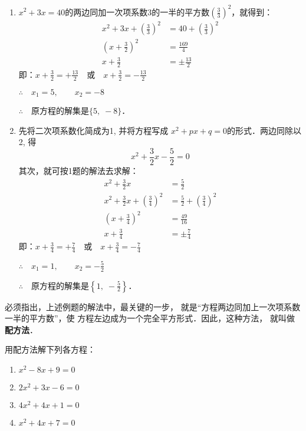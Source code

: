 \begin{solution}
\begin{enumerate}
    \item $x^2+3x=40$的两边同加一次项系数3的一半的平方数$\left(\frac{3}{3}\right)^2$，就得到：
\begin{align*}
    x^2+3x+ \left(\frac{3}{3}\right)^2&=40+\left(\frac{3}{3}\right)^2\\
    \left(x+\frac{3}{2}\right)^2&=\frac{169}{4}\\
    x+\frac{3}{2}&=\pm\frac{13}{2}  \tag{平方根的定义}
\end{align*}
即：$x+\frac{3}{2}=+\frac{13}{2}\quad \text{或}\quad x+\frac{3}{2}=-\frac{13}{2}$

$\therefore\quad x_1=5,\qquad x_2=-8$

$\therefore\quad $原方程的解集是$\{5,\;-8\}$．
\item 先将二次项系数化简成为1, 并将方程写成
$x^2+px+q=0$的形式．两边同除以2, 得
\[x^2+\frac{3}{2}x-\frac{5}{2}=0 \]
其次，就可按1题的解法去求解：
\begin{align*}
    x^2+\frac{3}{2}x&=\frac{5}{2}\tag{移项}\\
    x^2+\frac{3}{2}x+\left(\frac{3}{4}\right)^2&=\frac{5}{2}+\left(\frac{3}{4}\right)^2 \tag{配方}\\
    \left(x+\frac{3}{4}\right)^2&=\frac{49}{16}\\
    x+\frac{3}{4}&=\pm\frac{7}{4} \tag{平方根意义}
\end{align*}
即：$x+\frac{3}{4}=+\frac{7}{4} \quad \text{或}\quad x+\frac{3}{4}=-\frac{7}{4} $

$\therefore\quad x_1=1,\qquad x_2=-\frac{5}{2}$

$\therefore\quad $原方程的解集是$\left\{1,\;-\frac{5}{2}\right\}$．
\end{enumerate}
\end{solution}

必须指出，上述例题的解法中，最关键的一步，
就是“方程两边同加上一次项系数一半的平方数”，使
方程左边成为一个完全平方形式．因此，这种方法，
就叫做\textbf{配方法}．

\begin{example}
    用配方法解下列各方程：
\begin{multicols}{2}
\begin{enumerate}
    \item $x^2-8x+9=0$
\item $2x^2+3x-6=0$
\item $4x^2+4x+1=0$
\item $x^2+4x+7=0$
\end{enumerate}
\end{multicols}
\end{example}

